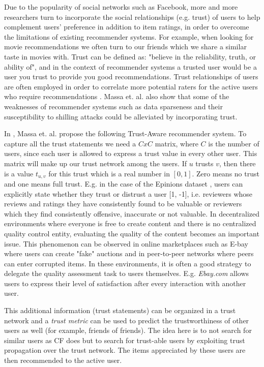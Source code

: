 Due to the popularity of social networks such as Facebook, more and more
researchers turn to incorporate the social relationships (e.g. trust) of users
to help complement users’ preference in addition to item ratings, in order to overcome the limitations of existing recommender systems. For example, when looking for movie recommendations we often turn to our friends which we share a similar taste in movies with. Trust can be defined as: "believe in the reliability, truth, or ability of", and in the context of recommender systems a trusted user would be a user you trust to provide you good recommendations. Trust relationships of users are often employed in order to correlate more potential raters for the active users who require recommendations \cite{Massa2004, Massa2007}. Massa et. al. \citep{Massa2004} also show that some of the weaknesses of recommender systems such as data sparseness and their susceptibility to shilling attacks could be alleviated by incorporating trust. 

In \cite{Massa2004}, Massa et. al. propose the following Trust-Aware recommender system.
To capture all the trust statements we need a $CxC$ matrix, where $C$ is the number of users, since each user is allowed to express a trust value in every other user. This matrix will make up our trust network among the users. If $u$
trusts $v$, then there is a value $t_{u,v}$ for this trust which is a real
number in $[0,1]$. Zero means no trust and one means full trust. E.g. in the case of the Epinions dataset \cite{Epinions}, users can explicitly state whether they trust or distrust a user [1, -1], i.e. reviewers whose reviews and ratings they have consistently found to be valuable or reviewers which they find consistently offensive, inaccurate or not valuable. In decentralized environments where everyone is free to create content and there
is no centralized quality control entity, evaluating the quality of the content becomes an important issue. This phenomenon can be observed in online
marketplaces such as E-bay where users can create "fake" auctions and in peer-to-peer networks where peers can enter corrupted items. In these environments, it is often a good strategy to delegate the quality assessment task to users themselves. E.g. \emph{Ebay.com} allows users to express their level of satisfaction after every interaction with another user.

This additional information (trust statements) can be organized in a trust network and a \emph{trust metric} can be used to predict the
trustworthiness of other users as well (for example, friends of friends). The idea here is to not search for similar users as CF does but to search for
trust-able users by exploiting trust propagation over the trust network. The items appreciated by these users are then recommended to the active user. 

